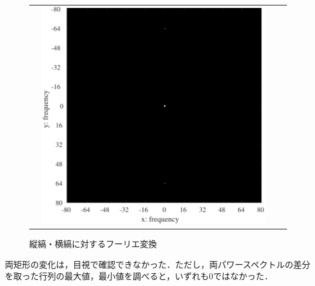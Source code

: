 \begin{figure}[H]
\begin{tabularx}{\textwidth}{p{}CCC}
\begin{minipage}{.25\textwidth}
        \end{minipage} &
        \begin{minipage}{.25\textwidth}
            \centering
            \includegraphics[keepaspectratio,width=.9\textwidth]{../../Figures/08_26_img64-fft.pdf}
        \end{minipage}                                                             \\
    \end{tabularx}
    \caption{縦縞・横縞に対するフーリエ変換}
\end{figure}
両矩形の変化は，目視で確認できなかった．ただし，両パワースペクトルの差分を取った行列の最大値，最小値を調べると，いずれも\(0\)ではなかった．
